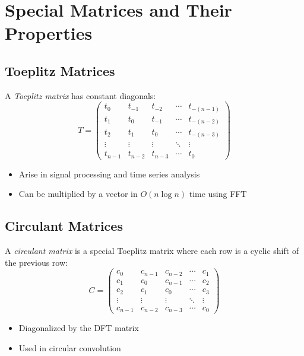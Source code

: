 \section{Special Matrices and Their Properties}
\subsection{Toeplitz Matrices}
A \emph{Toeplitz matrix} has constant diagonals:
\[
T = \begin{pmatrix}
t_0 & t_{-1} & t_{-2} & \cdots & t_{-(n-1)} \\
t_1 & t_0 & t_{-1} & \cdots & t_{-(n-2)} \\
t_2 & t_1 & t_0 & \cdots & t_{-(n-3)} \\
\vdots & \vdots & \vdots & \ddots & \vdots \\
t_{n-1} & t_{n-2} & t_{n-3} & \cdots & t_0
\end{pmatrix}
\]
\begin{itemize}
    \item Arise in signal processing and time series analysis
    \item Can be multiplied by a vector in $O(n \log n)$ time using FFT
\end{itemize}

\subsection{Circulant Matrices}
A \emph{circulant matrix} is a special Toeplitz matrix where each row is a cyclic shift of the previous row:
\[
C = \begin{pmatrix}
c_0 & c_{n-1} & c_{n-2} & \cdots & c_1 \\
c_1 & c_0 & c_{n-1} & \cdots & c_2 \\
c_2 & c_1 & c_0 & \cdots & c_3 \\
\vdots & \vdots & \vdots & \ddots & \vdots \\
c_{n-1} & c_{n-2} & c_{n-3} & \cdots & c_0
\end{pmatrix}
\]
\begin{itemize}
    \item Diagonalized by the DFT matrix
    \item Used in circular convolution
\end{itemize}

